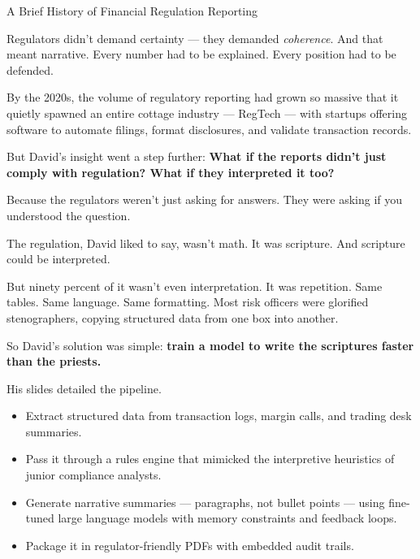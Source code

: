 \begin{HistoricalSidebar}{A Brief History of Financial Regulation Reporting}
    \medskip
    
    Regulators didn’t demand certainty — they demanded \textit{coherence}. And that meant narrative. Every 
    number had to be explained. Every position had to be defended.
    
    \medskip
    
    By the 2020s, the volume of regulatory reporting had grown so massive that it quietly spawned an entire 
    cottage industry — RegTech — with startups offering software to automate filings, format disclosures, and 
    validate transaction records.
    
    \medskip
    
    But David’s insight went a step further:
    \textbf{What if the reports didn’t just comply with regulation? What if they interpreted it too?}

    \medskip
    
    Because the regulators weren’t just asking for answers.
    They were asking if you understood the question.

\end{HistoricalSidebar}

\medskip

The regulation, David liked to say, wasn’t math. It was scripture.
And scripture could be interpreted.

But ninety percent of it wasn’t even interpretation. It was repetition.
Same tables. Same language. Same formatting.
Most risk officers were glorified stenographers, copying structured data from one box into another.

So David's solution was simple:
\textbf{train a model to write the scriptures faster than the priests.}

His slides detailed the pipeline.

\begin{itemize}
\item Extract structured data from transaction logs, margin calls, and trading desk summaries.
\item Pass it through a rules engine that mimicked the interpretive heuristics of junior compliance 
analysts.
\item Generate narrative summaries — paragraphs, not bullet points — using fine-tuned large language 
models with memory constraints and feedback loops.
\item Package it in regulator-friendly PDFs with embedded audit trails.
\end{itemize}

